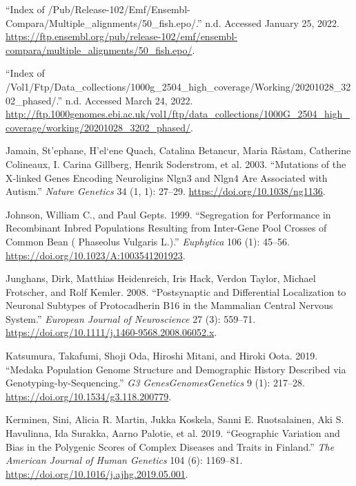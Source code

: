 \documentclass[
]{book}
\newlength{\cslhangindent}
\newlength{\cslentryspacingunit} %
\newenvironment{CSLReferences}[2] %
 {%
  \setlength{\parindent}{0pt}
  \ifodd #1
  \let\oldpar\par
  \def\par{\hangindent=\cslhangindent\oldpar}
  \fi
  \setlength{\parskip}{#2\cslentryspacingunit}
 }%
 {}
\begin{document}
\begin{CSLReferences}{1}{0}
\leavevmode{}%
{``Index of /Pub/Release-102/Emf/Ensembl-Compara/Multiple\_alignments/50\_fish.epo/.''} n.d. Accessed January 25, 2022. \url{https://ftp.ensembl.org/pub/release-102/emf/ensembl-compara/multiple_alignments/50_fish.epo/}.

\leavevmode{}%
{``Index of /Vol1/Ftp/Data\_collections/{1000g}\_2504\_high\_coverage/Working/20201028\_3202\_phased/.''} n.d. Accessed March 24, 2022. \url{http://ftp.1000genomes.ebi.ac.uk/vol1/ftp/data_collections/1000G_2504_high_coverage/working/20201028_3202_phased/}.

\leavevmode{}%
Jamain, St'ephane, H'el`ene Quach, Catalina Betancur, Maria Råstam, Catherine Colineaux, I. Carina Gillberg, Henrik Soderstrom, et al. 2003. {``Mutations of the {X-linked} Genes Encoding Neuroligins {Nlgn3} and {Nlgn4} Are Associated with Autism.''} \emph{Nature Genetics} 34 (1, 1): 27--29. \url{https://doi.org/10.1038/ng1136}.

\leavevmode{}%
Johnson, William C., and Paul Gepts. 1999. {``Segregation for Performance in Recombinant Inbred Populations Resulting from Inter-Gene Pool Crosses of Common Bean ( {Phaseolus} Vulgaris {L}.).''} \emph{Euphytica} 106 (1): 45--56. \url{https://doi.org/10.1023/A:1003541201923}.

\leavevmode{}%
Junghans, Dirk, Matthias Heidenreich, Iris Hack, Verdon Taylor, Michael Frotscher, and Rolf Kemler. 2008. {``Postsynaptic and Differential Localization to Neuronal Subtypes of Protocadherin Β16 in the Mammalian Central Nervous System.''} \emph{European Journal of Neuroscience} 27 (3): 559--71. \url{https://doi.org/10.1111/j.1460-9568.2008.06052.x}.

\leavevmode{}%
Katsumura, Takafumi, Shoji Oda, Hiroshi Mitani, and Hiroki Oota. 2019. {``Medaka {Population Genome Structure} and {Demographic History Described} via {Genotyping-by-Sequencing}.''} \emph{G3 Genes\textbar Genomes\textbar Genetics} 9 (1): 217--28. \url{https://doi.org/10.1534/g3.118.200779}.

\leavevmode{}%
Kerminen, Sini, Alicia R. Martin, Jukka Koskela, Sanni E. Ruotsalainen, Aki S. Havulinna, Ida Surakka, Aarno Palotie, et al. 2019. {``Geographic {Variation} and {Bias} in the {Polygenic Scores} of {Complex Diseases} and {Traits} in {Finland}.''} \emph{The American Journal of Human Genetics} 104 (6): 1169--81. \url{https://doi.org/10.1016/j.ajhg.2019.05.001}.


\end{CSLReferences}
\end{document}
